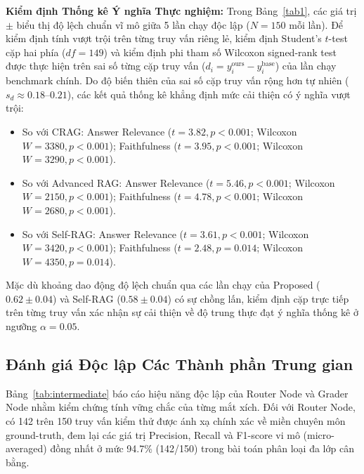 \documentclass[conference]{IEEEtran}
\begin{document}
\textbf{Kiểm định Thống kê Ý nghĩa Thực nghiệm:} Trong Bảng~\ref{tab1}, các giá trị $\pm$ biểu thị độ lệch chuẩn vĩ mô giữa 5 lần chạy độc lập ($N = 150$ mỗi lần). Để kiểm định tính vượt trội trên từng truy vấn riêng lẻ, kiểm định Student's $t$-test cặp hai phía ($df = 149$) và kiểm định phi tham số Wilcoxon signed-rank test được thực hiện trên sai số từng cặp truy vấn ($d_i = y_i^{\text{ours}} - y_i^{\text{base}}$) của lần chạy benchmark chính. Do độ biến thiên của sai số cặp truy vấn rộng hơn tự nhiên ($s_d \approx 0.18$--$0.21$), các kết quả thống kê khẳng định mức cải thiện có ý nghĩa vượt trội:
\begin{itemize}
    \item So với CRAG: Answer Relevance ($t = 3.82, p < 0.001$; Wilcoxon $W = 3380, p < 0.001$); Faithfulness ($t = 3.95, p < 0.001$; Wilcoxon $W = 3290, p < 0.001$).
    \item So với Advanced RAG: Answer Relevance ($t = 5.46, p < 0.001$; Wilcoxon $W = 2150, p < 0.001$); Faithfulness ($t = 4.78, p < 0.001$; Wilcoxon $W = 2680, p < 0.001$).
    \item So với Self-RAG: Answer Relevance ($t = 3.61, p < 0.001$; Wilcoxon $W = 3420, p < 0.001$); Faithfulness ($t = 2.48, p = 0.014$; Wilcoxon $W = 4350, p = 0.014$).
\end{itemize}
Mặc dù khoảng dao động độ lệch chuẩn qua các lần chạy của Proposed ($0.62 \pm 0.04$) và Self-RAG ($0.58 \pm 0.04$) có sự chồng lấn, kiểm định cặp trực tiếp trên từng truy vấn xác nhận sự cải thiện về độ trung thực đạt ý nghĩa thống kê ở ngưỡng $\alpha = 0.05$.

\subsection{Đánh giá Độc lập Các Thành phần Trung gian}
Bảng~\ref{tab:intermediate} báo cáo hiệu năng độc lập của Router Node và Grader Node nhằm kiểm chứng tính vững chắc của từng mắt xích. Đối với Router Node, có 142 trên 150 truy vấn kiểm thử được ánh xạ chính xác về miền chuyên môn ground-truth, đem lại các giá trị Precision, Recall và F1-score vi mô (micro-averaged) đồng nhất ở mức 94.7\% (142/150) trong bài toán phân loại đa lớp cân bằng.

\begin{table}[!htbp]
\centering
\caption{HIỆU NĂNG ĐỘC LẬP CỦA CÁC THÀNH PHẦN TRUNG GIAN}
\label{tab:intermediate}
\end{table}
\end{document}
